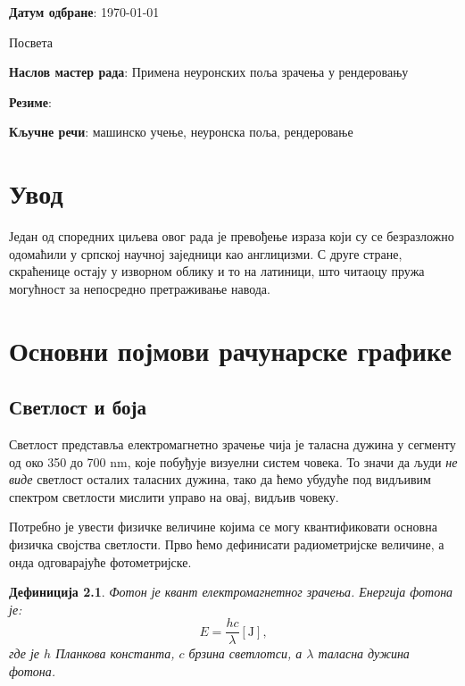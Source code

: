 \documentclass[12pt, a4paper, twoside]{book}
\numberwithin{equation}{chapter}
\numberwithin{theorem}{section}
\newtheorem{definition}{Дефиниција}
\numberwithin{definition}{section}
\numberwithin{definitionChapter}{chapter}
\begin{document}
\noindent \textbf{Датум одбране}: \today
\hspace{0pt}
\vfill

\newpage
\thispagestyle{empty}
Посвета

\newpage
\thispagestyle{empty}
\noindent \textbf{Наслов мастер рада}: Примена неуронских поља зрачења у рендеровању

\noindent \textbf{Резиме}:

\noindent \textbf{Кључне речи}: машинско учење, неуронска поља, рендеровање

\listoffigures
\listoftables
\tableofcontents

\chapter{Увод}

Један од споредних циљева овог рада је превођење израза који су се безразложно одомаћили
у српској научној заједници као англицизми. С друге стране, скраћенице остају у изворном
облику и то на латиници, што читаоцу пружа могућност за непосредно претраживање навода.

\chapter{Основни појмови рачунарске графике}
\section{Светлост и боја}
Светлост представља електромагнетно зрачење чија је таласна дужина у сегменту од око 350 до
700 nm, које побуђује визуелни систем човека. То значи да људи \textit{не виде} светлост
осталих таласних дужина, тако да ћемо убудуће под видљивим спектром светлости мислити управо
на овај, видљив човеку.


Потребно је увести физичке величине којима се могу квантификовати основна физичка својства
светлости. Прво ћемо дефинисати радиометријске величине, а онда одговарајуће фотометријске.

\begin{definition}
	Фотон је квант електромагнетног зрачења. Енергија фотона је:
	$$E=\frac{hc}{\lambda} \left[\mathrm{J}\right],$$ где је $h$ Планкова константа, $c$ брзина светлотси, а $\lambda$ 
	таласна дужина фотона.
\end{definition}
\end{document}
